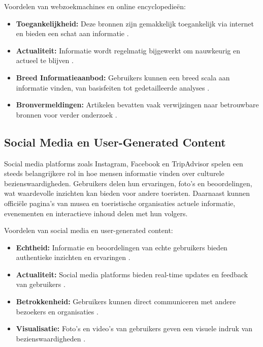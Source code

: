 Voordelen van webzoekmachines en online encyclopedieën:
\begin{itemize}
    \item \textbf{Toegankelijkheid:} Deze bronnen zijn gemakkelijk toegankelijk via internet en bieden een schat aan informatie \autocite{mcclanahan2014wikipedia}.
    \item \textbf{Actualiteit:} Informatie wordt regelmatig bijgewerkt om nauwkeurig en actueel te blijven \autocite{giles2005internet}.
    \item \textbf{Breed Informatieaanbod:} Gebruikers kunnen een breed scala aan informatie vinden, van basisfeiten tot gedetailleerde analyses \autocite{okay2020information}.
    \item \textbf{Bronvermeldingen:} Artikelen bevatten vaak verwijzingen naar betrouwbare bronnen voor verder onderzoek \autocite{okoli2014wikipedia}.
\end{itemize}

\subsection{Social Media en User-Generated Content}
Social media platforms zoals Instagram, Facebook en TripAdvisor spelen een steeds belangrijkere rol in hoe mensen informatie vinden over culturele bezienswaardigheden. Gebruikers delen hun ervaringen, foto's en beoordelingen, wat waardevolle inzichten kan bieden voor andere toeristen. Daarnaast kunnen officiële pagina's van musea en toeristische organisaties actuele informatie, evenementen en interactieve inhoud delen met hun volgers.

Voordelen van social media en user-generated content:
\begin{itemize}
    \item \textbf{Echtheid:} Informatie en beoordelingen van echte gebruikers bieden authentieke inzichten en ervaringen \autocite{liu2015influence}.
    \item \textbf{Actualiteit:} Social media platforms bieden real-time updates en feedback van gebruikers \autocite{kwok2013exploring}.
    \item \textbf{Betrokkenheid:} Gebruikers kunnen direct communiceren met andere bezoekers en organisaties \autocite{schivinski2015influence}.
    \item \textbf{Visualisatie:} Foto's en video's van gebruikers geven een visuele indruk van bezienswaardigheden \autocite{munar2011social}.
\end{itemize}

